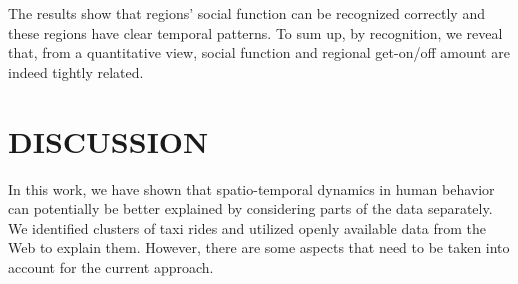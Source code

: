 \documentclass[a4paper, 10pt, conference]{ieeeconf}      %
\begin{document}
The results show that regions’ social function can be recognized correctly and these regions have clear temporal patterns. To sum up, by recognition, we reveal that, from a quantitative view, social function and regional get-on/off amount are indeed tightly related.

\section{DISCUSSION}
In this work, we have shown that spatio-temporal dynamics in human behavior can potentially be better explained by considering parts of the data separately. We identified clusters of taxi rides and utilized openly available data from the Web to explain them. However, there are some aspects that need to be taken into account for the current approach.
\end{document}
